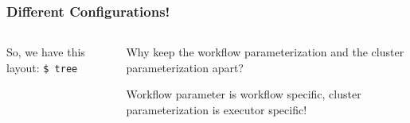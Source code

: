 \begin{frame}
  \frametitle{Different Configurations!}
  \begin{columns}
    \begin{column}{0.5\textwidth}
        So, we have this layout:
              {\tiny \DTsetlength{0.2em}{1em}{0.2em}{0.4pt}{.6pt}
\texttt{\$ tree}
}
    \end{column}
    \begin{column}{0.5\textwidth}
      \begin{question}
      	Why keep the workflow parameterization and the cluster parameterization apart?
      \end{question}
      \pause
      \begin{docs}[Answer]
      	Workflow parameter is workflow specific, cluster parameterization is executor specific!
      \end{docs}
    \end{column}
  \end{columns}
\end{frame}

